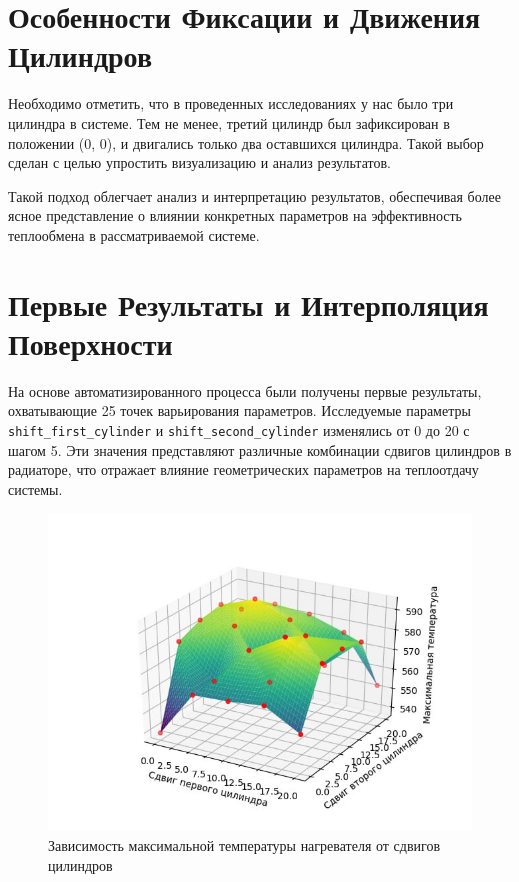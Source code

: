\documentclass[a4paper,12pt]{article}
\theoremstyle{plain} %
\theoremstyle{definition} %
\theoremstyle{remark} %
\begin{document}
\section{Особенности Фиксации и Движения Цилиндров}

Необходимо отметить, что в проведенных исследованиях у нас было три цилиндра в системе. Тем не менее, третий цилиндр был зафиксирован в положении (0, 0), и двигались только два оставшихся цилиндра. Такой выбор сделан с целью упростить визуализацию и анализ результатов.

Такой подход облегчает анализ и интерпретацию результатов, обеспечивая более ясное представление о влиянии конкретных параметров на эффективность теплообмена в рассматриваемой системе.

\section{Первые Результаты и Интерполяция Поверхности}

На основе автоматизированного процесса были получены первые результаты, охватывающие 25 точек варьирования параметров. Исследуемые параметры \texttt{shift\_first\_cylinder} и \texttt{shift\_second\_cylinder} изменялись от 0 до 20 с шагом 5. Эти значения представляют различные комбинации сдвигов цилиндров в радиаторе, что отражает влияние геометрических параметров на теплоотдачу системы.

\begin{figure}[h]
	\begin{center}
		\includegraphics[width=0.4\linewidth]{16.1.jpg}
		\caption{Зависимость максимальной температуры нагревателя от сдвигов цилиндров} %
	\end{center}
\end{figure}
\end{document}
